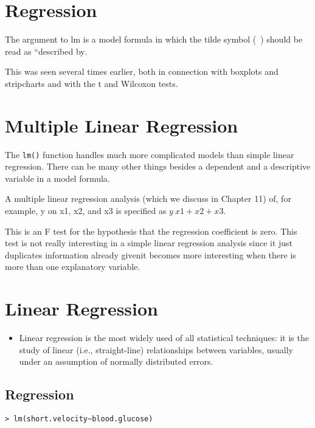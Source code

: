 \documentclass[]{report}
\begin{document}
\section{Regression}

The argument to lm is a model formula in which the tilde symbol
(~) should be read as ``described by.


This was seen several times earlier, both in connection with
boxplots and stripcharts and with the t and Wilcoxon tests.



\section{Multiple Linear Regression}
The \texttt{lm()} function handles much more
complicated models than simple linear regression. There can be many other things besides a dependent and a descriptive variable in a model formula.

A multiple linear regression analysis (which we discuss in Chapter
11) of, for example, y on x1, x2, and x3 is specified as $y ~ x1 +
x2 + x3$.


This is an F test for the hypothesis that the regression coefficient is zero. This test is not really interesting in a
simple linear regression analysis since it just duplicates information already givenit becomes more interesting when there is more than one explanatory variable.







\section*{Linear Regression}
\begin{itemize}
	\item Linear regression is the most widely used of all statistical techniques: it is the study of linear (i.e., straight-line) relationships between variables, usually under an assumption of normally distributed errors.
\end{itemize}

\subsection{Regression}

\begin{verbatim}
> lm(short.velocity~blood.glucose)
\end{verbatim}
\end{document}

